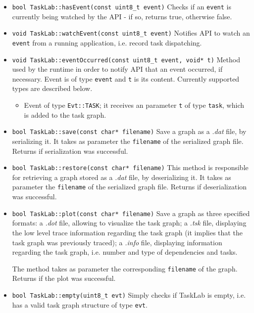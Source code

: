 \begin{itemize}
\item\texttt{bool TaskLab::hasEvent(const uint8\_t event)} \newline
Checks if an \texttt{event} is currently being watched by the API - if so, returns true, otherwise false.

\item\texttt{void TaskLab::watchEvent(const uint8\_t event)} \newline
Notifies API to watch an \texttt{event} from a running application, i.e. record task dispatching.

\item\texttt{void TaskLab::eventOccurred(const uint8\_t event, void* t)} \newline
Method used by the runtime in order to notify API that an event occurred, if necessary. Event is of type \texttt{event} and \texttt{t} is its content. Currently supported types are described below.
\begin{itemize} 
\item Event of type \texttt{Evt::TASK}; it receives an parameter \texttt{t} of type \texttt{task}, which is added to the task graph.
\end{itemize}

\item \texttt{bool TaskLab::save(const char* filename)} \newline
Save a graph as a \textit{.dat} file, by serializing it. It takes as parameter the \texttt{filename} of the serialized graph file. Returns if serialization was successful.

\item \texttt{bool TaskLab::restore(const char* filename)} \newline
This method is responsible for retrieving a graph stored as a \textit{.dat} file, by deserializing it. It takes as parameter the \texttt{filename} of the serialized graph file. Returns if deserialization was successful.

\item \texttt{bool TaskLab::plot(const char* filename)} \newline
Save a graph as three specified formats: a \textit{.dot} file, allowing to visualize the task graph; a \textit{.tsk} file, displaying the low level trace information regarding the task graph (it implies that the task graph was previously traced); a \textit{.info} file, displaying information regarding the task graph, i.e. number and type of dependencies and tasks. 

The method takes as parameter the corresponding \texttt{filename} of the graph. Returns if the plot was successful. 

\item \texttt{bool TaskLab::empty(uint8\_t evt)} \newline
Simply checks if TaskLab is empty, i.e. has a valid task graph structure of type \texttt{evt}.
\end{itemize}

